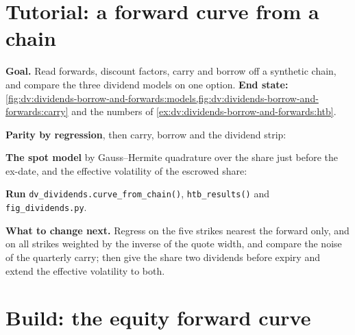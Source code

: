 \section{Tutorial: a forward curve from a chain}\label{tut:dv:dividends-borrow-and-forwards:tut}

\begin{tutorial}
\textbf{Goal.} Read forwards, discount factors, carry and borrow off a synthetic chain,
and compare the three dividend models on one option. \textbf{End state:}
\cref{fig:dv:dividends-borrow-and-forwards:models,fig:dv:dividends-borrow-and-forwards:carry}
and the numbers of \cref{ex:dv:dividends-borrow-and-forwards:htb}.
\begin{tutsteps}
\item \textbf{Parity by regression}, then carry, borrow and the dividend strip:
\label{lst:dv:dividends-borrow-and-forwards:parity}
\item \textbf{The spot model} by Gauss--Hermite quadrature over the share just before
the ex-date, and the effective volatility of the escrowed share:
\label{lst:dv:dividends-borrow-and-forwards:spot}
\item \textbf{Run} \texttt{dv\_dividends.curve\_from\_chain()},
\texttt{htb\_results()} and \texttt{fig\_dividends.py}.
\end{tutsteps}
\textbf{What to change next.} Regress on the five strikes nearest the forward only, and
on all strikes weighted by the inverse of the quote width, and compare the noise of the
quarterly carry; then give the share two dividends before expiry and extend the
effective volatility to both.
\end{tutorial}

\section{Build: the equity forward curve}\label{bld:dv:dividends-borrow-and-forwards:divfwd}

